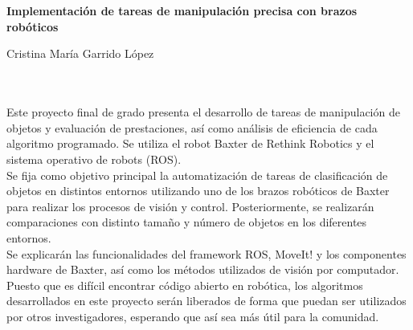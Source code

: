 \chapter*{}


%



\cleardoublepage
\thispagestyle{empty}

\begin{center}
{\large\bfseries Implementación de tareas de manipulación precisa con brazos robóticos}\\
\end{center}
\begin{center}
Cristina María Garrido López\\
\end{center}

\\

\vspace{0.7cm}
\\

\noindent Este proyecto final de grado presenta el desarrollo de tareas de manipulación de objetos y evaluación de prestaciones, así como análisis de eficiencia de cada algoritmo programado. Se utiliza el robot Baxter de Rethink Robotics y el sistema operativo de robots (ROS). \\

\noindent Se fija como objetivo principal la automatización de tareas de clasificación de objetos en distintos entornos utilizando uno de los brazos robóticos de Baxter para realizar los procesos de visión y control. Posteriormente, se realizarán comparaciones con distinto tamaño y número de objetos en los diferentes entornos.\\

\noindent Se explicarán las funcionalidades del framework ROS, MoveIt! y los componentes hardware de Baxter, así como los métodos utilizados de visión por computador. \\

\noindent Puesto que es difícil encontrar código abierto en robótica, los algoritmos desarrollados en este proyecto serán liberados de forma que puedan ser utilizados por otros investigadores, esperando que así sea más útil para la comunidad.\\
\cleardoublepage


